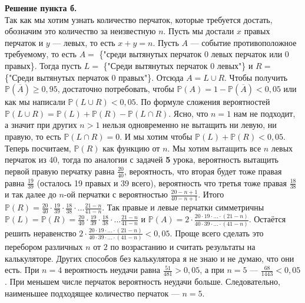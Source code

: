 \begin{solution}\label{solution-conditional-probability-homework-5-method-1}
\textbf{Решение пункта б.} \\
 Так как мы хотим узнать количество перчаток, которые требуется достать, обозначим это количество за неизвестную $n$. Пусть мы достали $x$ правых перчаток и $y$  —  левых, то есть $x+y = n$. Пусть $A$  —  событие противоположное требуемому, то есть $A =$ \{"среди вытянутых перчаток 0 левых перчаток или 0 правых\}. Тогда пусть $L =$ \{"Среди вытянутых перчаток 0 левых"\} и $R =$ \{"Среди вытянутых перчаток 0 правых"\}. Отсюда $A= L\cup R$. Чтобы получить $\mathbb{P}(\overline{A}) \geq 0,95$, достаточно потребовать, чтобы $\mathbb{P}(A) = 1 - \mathbb{P}(\overline{A}) < 0,05$ или как мы написали $\mathbb{P}(L\cup R) < 0,05$. По формуле сложения вероятностей $\mathbb{P}(L\cup R) = \mathbb{P}(L) + \mathbb{P}(R) - \mathbb{P}(L\cap R)$. Ясно, что $n= 1$ нам не подходит, а значит при других $n>1$ нельзя одновременно не вытащить ни левую, ни правую, то есть $\mathbb{P}(L\cap R) = 0$. И мы хотим чтобы $\mathbb{P}(L) + \mathbb{P}(R) < 0,05$. Теперь посчитаем, $\mathbb{P}(R)$ как функцию от $n$. Мы хотим вытащить все $n$ левых перчаток из $40$, тогда по аналогии с задачей \textbf{5} урока, вероятность вытащить первой правую перчатку равна $\frac{20}{40}$, вероятность, что вторая будет тоже правая равна $\frac{19}{39}$ (осталось 19 правых и 39 всего), вероятность что третья тоже правая $\frac{18}{38}$ и так далее до $n$-ой перчатки с вероятностью $\frac{20-n +1}{40 - n +1}$. Итого $\mathbb{P}(R) = \frac{20}{40}\cdot \frac{19}{39}\cdot\frac{18}{38}\cdot \dots \frac{21 - n}{41-n}$. Так правые и левые перчатки симметричны $\mathbb{P}(L) = \mathbb{P}(R) = \frac{20}{40}\cdot \frac{19}{39}\cdot\frac{18}{38}\cdot \dots \frac{21 - n}{41-n}$ и $\mathbb{P}(A) = 2\cdot \frac{20\cdot 19\cdot\dots\cdot (21-n)}{40\cdot 39\cdot \dots\cdot (41 - n)}$. Остаётся решить неравенство $2\cdot \frac{20\cdot 19\cdot\dots\cdot (21-n)}{40\cdot 39\cdot \dots\cdot (41 - n)} < 0,05$. Проще всего сделать это перебором различных $n$ от $2$ по возрастанию и считать результаты на калькуляторе. Других способов без калькулятора я не знаю и не думаю, что они есть. При $n=4$ вероятность неудачи равна $\frac{51}{481}>0,05$, а при $n=5$ — $\frac{68}{1443}<0,05$. При меньшем числе перчаток вероятность неудачи больше. Следовательно, наименьшее подходящее количество перчаток — $n=5$.
\end{solution}

